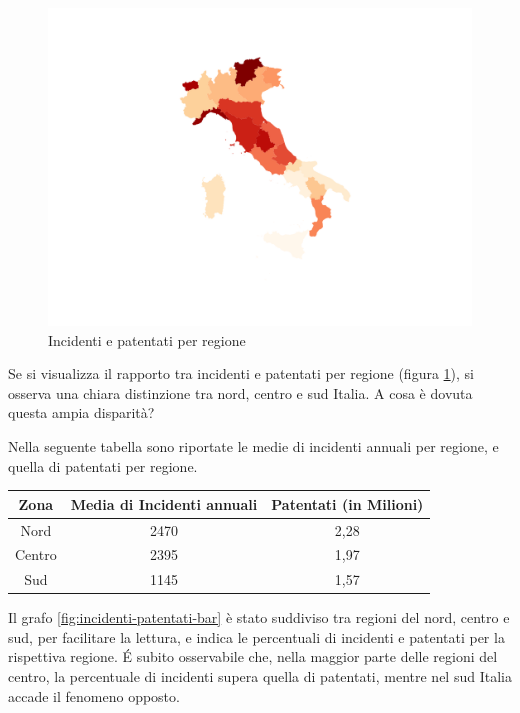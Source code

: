\documentclass[a4paper]{report}
\begin{document}
\begin{figure}
    \includegraphics[width=\linewidth]{../src/incidenti/incidenti_aci/mappe_regioni/incidenti_patenti.png}
    \caption{Incidenti e patentati per regione}
    \label{fig:incidenti-patentati}
\end{figure}

Se si visualizza il rapporto tra incidenti e patentati per regione (figura \ref{fig:incidenti-patentati}), 
si osserva una chiara distinzione tra nord, centro e sud Italia.
A cosa è dovuta questa ampia disparità?

Nella seguente tabella sono riportate le medie di incidenti annuali per regione, 
e quella di patentati per regione.

\begin{center}
    \def\arraystretch{1.5}%
    \begin{tabular}{ |c|c|c| } 
    \hline
    Zona & Media di Incidenti annuali & Patentati (in Milioni) \\ 
    \hline
    \rowcolor{TableGray}
    Nord    &   2470 &   2,28 \\ 
    Centro  &   2395 &   1,97 \\ 
    \rowcolor{TableGray}
    Sud     &   1145 &   1,57 \\ 
    \hline
    \end{tabular}
\end{center}

Il grafo \ref{fig:incidenti-patentati-bar} è stato suddiviso tra regioni del nord, 
centro e sud, per facilitare la lettura, e indica le percentuali di incidenti e patentati 
per la rispettiva regione. 
\'E subito osservabile che, nella maggior parte delle regioni del centro, 
la percentuale di incidenti supera quella di patentati, mentre nel sud Italia 
accade il fenomeno opposto.
\end{document}
